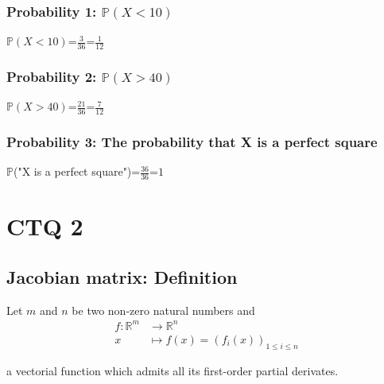 \documentclass[11pt]{article}
\begin{document}
\subsubsection{Probability 1: $\mathbb {P}$\((X < 10)\)}


$\mathbb {P}$\((X < 10)\)=$\frac{3}{36}$=$\frac{1}{12}$


\subsubsection{Probability 2: $\mathbb {P}$\((X > 40)\)}


$\mathbb {P}$\((X > 40)\)=$\frac{21}{36}$=$\frac{7}{12}$

\subsubsection{Probability 3: The probability that X is a perfect square}


$\mathbb {P}$("X is a perfect square")=$\frac{36}{36}$=$1$

\newpage

\section{CTQ 2}
\subsection{Jacobian matrix: Definition}

Let $m$ and $n$ be two non-zero natural numbers and
\begin{align*}
f\colon \mathbb{R}^m & \longrightarrow\mathbb{R}^n\\
x&\longmapsto f(x)=(f_i(x))_{1 \leq i \leq n}
\end{align*}

a vectorial function which admits all its first-order partial derivates.
\end{document}
